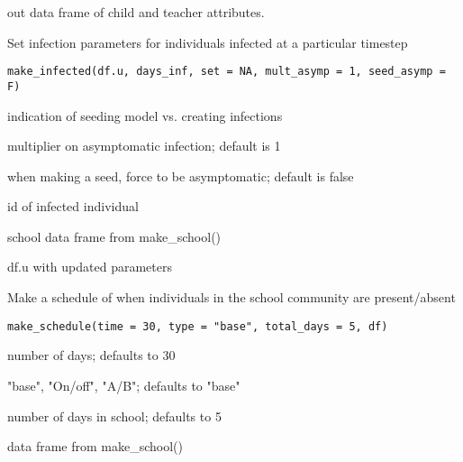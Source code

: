 \documentclass[a4paper]{book}
\begin{document}
%
\begin{Value}
out data frame of child and teacher attributes.
\end{Value}
%
\begin{Description}\relax
Set infection parameters for individuals infected at a particular timestep
\end{Description}
%
\begin{Usage}
\begin{verbatim}
make_infected(df.u, days_inf, set = NA, mult_asymp = 1, seed_asymp = F)
\end{verbatim}
\end{Usage}
%
\begin{Arguments}
\begin{ldescription}
\item[\code{set}] indication of seeding model vs. creating infections

\item[\code{mult\_asymp}] multiplier on asymptomatic infection; default is 1

\item[\code{seed\_asymp}] when making a seed, force to be asymptomatic; default is false

\item[\code{a}] id of infected individual

\item[\code{df}] school data frame from make\_school()
\end{ldescription}
\end{Arguments}
%
\begin{Value}
df.u with updated parameters
\end{Value}
%
\begin{Description}\relax
Make a schedule of when individuals in the school community are
present/absent
\end{Description}
%
\begin{Usage}
\begin{verbatim}
make_schedule(time = 30, type = "base", total_days = 5, df)
\end{verbatim}
\end{Usage}
%
\begin{Arguments}
\begin{ldescription}
\item[\code{time}] number of days; defaults to 30

\item[\code{type}] "base", "On/off", "A/B"; defaults to "base"

\item[\code{total\_days}] number of days in school; defaults to 5

\item[\code{df}] data frame from make\_school()
\end{ldescription}
\end{Arguments}
\end{document}
